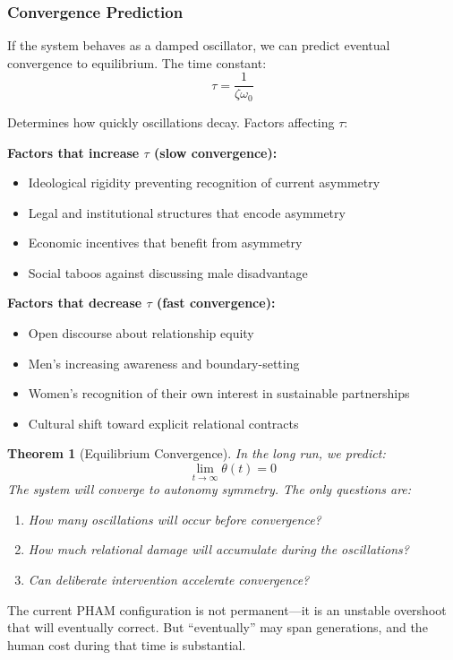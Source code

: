 \documentclass[12pt, letterpaper]{article}
\newtheorem{theorem}{Theorem}[section]
\begin{document}
\subsubsection{Convergence Prediction}

If the system behaves as a damped oscillator, we can predict eventual convergence to equilibrium. The time constant:
\[
\tau = \frac{1}{\zeta\omega_0}
\]

Determines how quickly oscillations decay. Factors affecting $\tau$:

\textbf{Factors that increase $\tau$ (slow convergence):}
\begin{itemize}
    \item Ideological rigidity preventing recognition of current asymmetry
    \item Legal and institutional structures that encode asymmetry
    \item Economic incentives that benefit from asymmetry
    \item Social taboos against discussing male disadvantage
\end{itemize}

\textbf{Factors that decrease $\tau$ (fast convergence):}
\begin{itemize}
    \item Open discourse about relationship equity
    \item Men's increasing awareness and boundary-setting
    \item Women's recognition of their own interest in sustainable partnerships
    \item Cultural shift toward explicit relational contracts
\end{itemize}

\begin{theorem}[Equilibrium Convergence]
In the long run, we predict:
\[
\lim_{t \to \infty} \theta(t) = 0
\]
The system will converge to autonomy symmetry. The only questions are:
\begin{enumerate}
    \item How many oscillations will occur before convergence?
    \item How much relational damage will accumulate during the oscillations?
    \item Can deliberate intervention accelerate convergence?
\end{enumerate}
\end{theorem}

The current PHAM configuration is not permanent---it is an unstable overshoot that will eventually correct. But ``eventually'' may span generations, and the human cost during that time is substantial.
\end{document}
